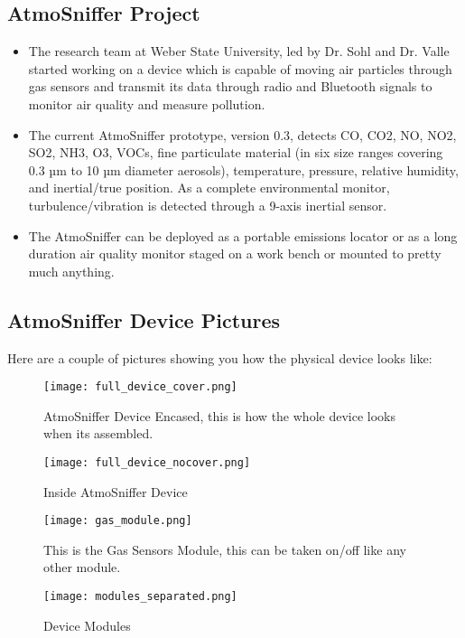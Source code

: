 \subsection{AtmoSniffer Project}
\begin{itemize}
\item The research team at Weber State University, led by Dr. Sohl and Dr. Valle started working on a device which is capable of moving air particles through gas sensors and transmit its data through radio and Bluetooth signals to monitor air quality and measure pollution.

\item The current AtmoSniffer prototype, version 0.3, detects CO, CO2, NO, NO2, SO2, NH3, O3, VOCs, fine particulate material (in six size ranges covering 0.3 µm to 10 µm diameter aerosols), temperature, pressure, relative humidity, and inertial/true position. As a complete environmental monitor, turbulence/vibration is detected through a 9-axis inertial sensor.

\item The AtmoSniffer can be deployed as a portable emissions locator or as a long duration air quality monitor staged on a work bench or mounted to pretty much anything.
\end{itemize}

\subsection{AtmoSniffer Device Pictures}
Here are a couple of pictures showing you how the physical device looks like:

\begin{figure}[h]
\centering
\texttt{[image: full\_device\_cover.png]}
 \caption{AtmoSniffer Device Encased, this is how the whole device looks when its assembled.}
 \label{fig:encased_device}
\end{figure}

\begin{figure}[h]
\centering
\texttt{[image: full\_device\_nocover.png]}
 \caption{Inside AtmoSniffer Device}
 \label{fig:inside_device}
\end{figure}

\begin{figure}[h]
\centering
\texttt{[image: gas\_module.png]}
 \caption{This is the Gas Sensors Module, this can be taken on/off like any other module.}
 \label{fig:gas_sensors}
\end{figure}

\begin{figure}[h]
\centering
\texttt{[image: modules\_separated.png]}
 \caption{Device Modules}
 \label{fig:device_modules}
\end{figure}

